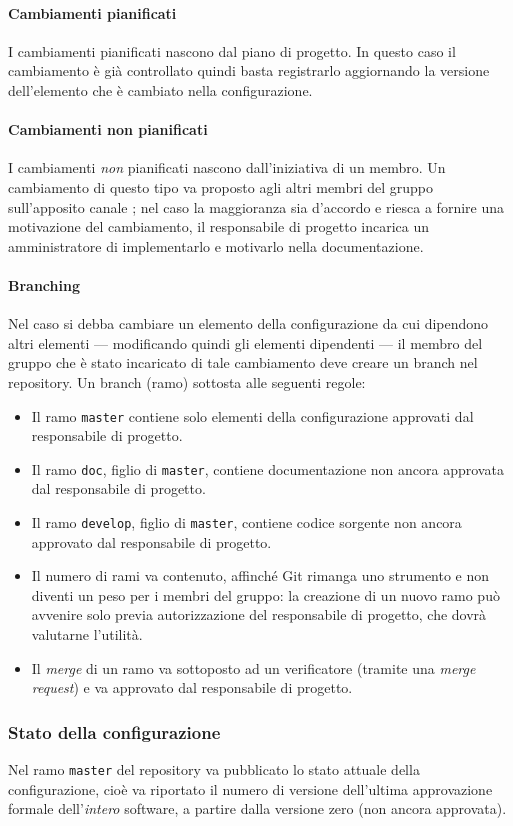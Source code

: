 \paragraph{Cambiamenti pianificati} I cambiamenti pianificati nascono dal piano di progetto. In questo caso il cambiamento è già controllato quindi basta registrarlo aggiornando la versione dell'elemento che è cambiato nella configurazione.
\paragraph{Cambiamenti non pianificati} I cambiamenti \emph{non} pianificati nascono dall'iniziativa di un membro. Un cambiamento di questo tipo va proposto agli altri membri del gruppo sull'apposito canale ; nel caso la maggioranza sia d'accordo e riesca a fornire una motivazione del cambiamento, il responsabile di progetto incarica un amministratore di implementarlo e motivarlo nella documentazione.
\paragraph{Branching} Nel caso si debba cambiare un elemento della configurazione da cui dipendono altri elementi --- modificando quindi gli elementi dipendenti --- il membro del gruppo che è stato incaricato di tale cambiamento deve creare un branch nel repository. Un branch (ramo) sottosta alle seguenti regole:
\begin{itemize}
	\item Il ramo \texttt{master} contiene solo elementi della configurazione approvati dal responsabile di progetto.
	\item Il ramo \texttt{doc}, figlio di \texttt{master}, contiene documentazione non ancora approvata dal responsabile di progetto.
	\item Il ramo \texttt{develop}, figlio di \texttt{master}, contiene codice sorgente non ancora approvato dal responsabile di progetto.
	\item Il numero di rami va contenuto, affinché Git rimanga uno strumento e non diventi un peso per i membri del gruppo: la creazione di un nuovo ramo può avvenire solo previa autorizzazione del responsabile di progetto, che dovrà valutarne l'utilità.
	\item Il \emph{merge} di un ramo va sottoposto ad un verificatore (tramite una \emph{merge request}) e va approvato dal responsabile di progetto.
\end{itemize}

\subsubsection{Stato della configurazione}
Nel ramo \texttt{master} del repository va pubblicato lo stato attuale della configurazione, cioè va riportato il numero di versione dell'ultima approvazione formale dell'\emph{intero} software, a partire dalla versione zero (non ancora approvata).



